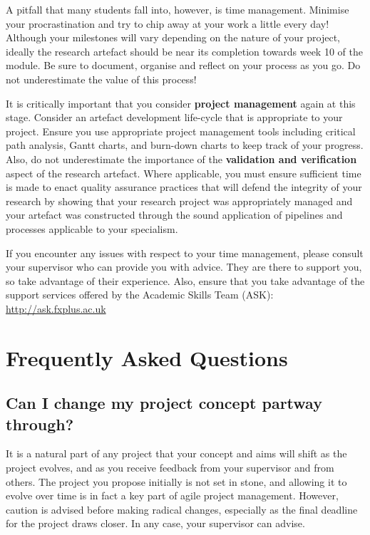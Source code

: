 A pitfall that many students fall into, however, is time management. Minimise your procrastination and try to chip away at your work a little every day! Although your milestones will vary depending on the nature of your project, ideally the research artefact should be near its completion towards week 10 of the module. Be sure to document, organise and reflect on your process as you go. Do not underestimate the value of this process! 

It is critically important that you consider \textbf{project management} again at this stage. Consider an artefact development life-cycle that is appropriate to your project. Ensure you use appropriate project management tools including critical path analysis, Gantt charts, and burn-down charts to keep track of your progress. Also, do not underestimate the importance of the \textbf{validation and verification} aspect of the research artefact. Where applicable, you must ensure sufficient time is made to enact quality assurance practices that will defend the integrity of your research by showing that your research project was appropriately managed and your artefact was constructed through the sound application of pipelines and processes applicable to your specialism.

If you encounter any issues with respect to your time management, please consult your supervisor who can provide you with advice. They are there to support you, so take advantage of their experience. Also, ensure that you take advantage of the support services offered by the Academic Skills Team (ASK): \url{http://ask.fxplus.ac.uk}

\section*{Frequently Asked Questions}

\subsection*{Can I change my project concept partway through?} 

It is a natural part of any project that your concept and aims will shift as the project evolves, and as you receive feedback from your supervisor and from others.
The project you propose initially is not set in stone, and allowing it to evolve over time is in fact a key part of agile project management.
However, caution is advised before making radical changes, especially as the final deadline for the project draws closer.
In any case, your supervisor can advise.

